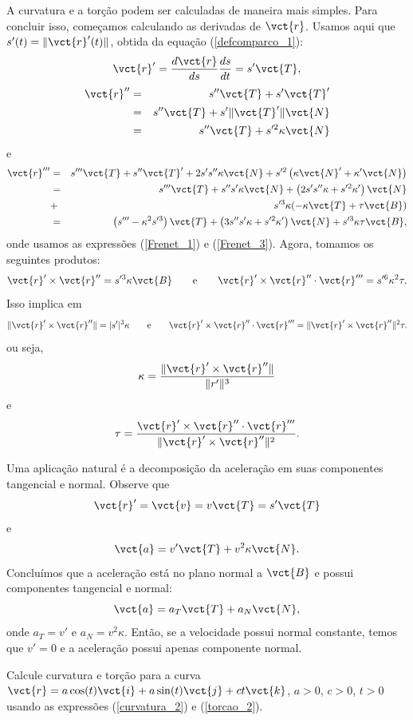  

A curvatura e a torção podem ser calculadas de maneira mais simples. Para concluir isso, começamos calculando as derivadas de $\vct{r}$. Usamos aqui que $s'(t)=\|\vct{r}'(t)\|$, obtida da equação (\ref{defcomparco_1}):
$$
\vct{r}'=\frac{d\vct{r}}{ds}\frac{ds}{dt}=s' \vct{T},
$$
\begin{eqnarray*}
\vct{r}''&=&s'' \vct{T}+s' \vct{T}'\\&=&s'' \vct{T}+s' \|\vct{T}'\|\vct{N}\\
&=&s'' \vct{T}+s'^2 \kappa \vct{N}
\end{eqnarray*}
e
\begin{eqnarray*}
\vct{r}'''&=&s''' \vct{T}+s''\vct{T}'+2s's''\kappa \vct{N}+s'^2 \left(\kappa \vct{N}'+\kappa' \vct{N}\right)\\
&=&s''' \vct{T}+s''s'\kappa \vct{N}+\left(2s's''\kappa+s'^2\kappa'\right) \vct{N}\\
&+&s'^3 \kappa (-\kappa \vct{T}+\tau\vct{B})\\
&=&\left(s'''-\kappa^2s'^3\right) \vct{T}+\left(3s''s'\kappa +s'^2\kappa'\right)\vct{N}+s'^3 \kappa \tau\vct{B},
\end{eqnarray*}
onde usamos as expressões (\ref{Frenet_1}) e (\ref{Frenet_3}). Agora, tomamos os seguintes produtos:
$$
\vct{r}'\times \vct{r}''=s'^3\kappa \vct{B}\qquad\text{e}\qquad
\vct{r}'\times \vct{r}''\cdot \vct{r}'''=s'^6\kappa^2\tau.
$$
Isso implica em 
$$
\|\vct{r}'\times \vct{r}''\|=|s'|^3\kappa\qquad\text{e}\qquad
\vct{r}'\times \vct{r}''\cdot \vct{r}'''=\|\vct{r}'\times \vct{r}''\|^2\tau.
$$
ou seja,
\begin{equation}{\label{curvatura_2}}
\kappa =\frac{\|\vct{r}'\times \vct{r}''\|}{\|r'\|^3}
\end{equation}
e
\begin{equation}{\label{torcao_2}}
\tau=\frac{\vct{r}'\times \vct{r}''\cdot \vct{r}'''}{\|\vct{r}'\times \vct{r}''\|^2}.
\end{equation}

\begin{obs}Uma aplicação natural é a decomposição da aceleração em suas componentes tangencial e normal. Observe que
$$
\vct{r}'=\vct{v}=v\vct{T}=s' \vct{T}
$$
e
$$
\vct{a}=v' \vct{T}+v^2 \kappa \vct{N}.
$$
Concluímos que a aceleração está no plano normal a $\vct{B}$ e possui componentes tangencial e normal:
$$
\vct{a}=a_T \vct{T}+a_N \vct{N},
$$
onde $a_T=v'$ e $a_N=v^2\kappa$. Então, se a velocidade possui normal constante, temos que $v'=0$ e a aceleração possui apenas componente normal.

\end{obs}
\begin{exer}Calcule curvatura e torção para a curva $\vct{r}=a\cos(t)\vct{i}+a\sin(t)\vct{j}+ct\vct{k}$, $a>0$, $c>0$, $t>0$ usando as expressões (\ref{curvatura_2}) e (\ref{torcao_2}).
\end{exer}

